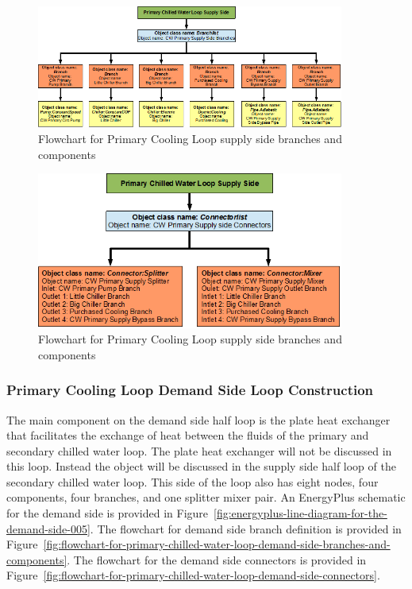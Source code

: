 \begin{figure}[hbtp] %
\centering
\includegraphics[width=0.9\textwidth, height=0.9\textheight, keepaspectratio=true]{media/image094.png}
\caption{Flowchart for Primary Cooling Loop supply side branches and components \protect \label{fig:flowchart-for-primary-cooling-loop-supply-side-branches-and-components}}
\end{figure}

\begin{figure}[hbtp] %
\centering
\includegraphics[width=0.9\textwidth, height=0.9\textheight, keepaspectratio=true]{media/image095.png}
\caption{Flowchart for Primary Cooling Loop supply side branches and components \protect \label{fig:flowchart-for-primary-cooling-loop-supply-side-connectors-2016-06-17}}
\end{figure}

\subsubsection{Primary Cooling Loop Demand Side Loop Construction}\label{primary-cooling-loop-demand-side-loop-construction}

The main component on the demand side half loop is the plate heat exchanger that facilitates the exchange of heat between the fluids of the primary and secondary chilled water loop. The plate heat exchanger will not be discussed in this loop. Instead the object will be discussed in the supply side half loop of the secondary chilled water loop. This side of the loop also has eight nodes, four components, four branches, and one splitter mixer pair. An EnergyPlus schematic for the demand side is provided in Figure~\ref{fig:energyplus-line-diagram-for-the-demand-side-005}. The flowchart for demand side branch definition is provided in Figure~\ref{fig:flowchart-for-primary-chilled-water-loop-demand-side-branches-and-components}. The flowchart for the demand side connectors is provided in Figure~\ref{fig:flowchart-for-primary-chilled-water-loop-demand-side-connectors}.

